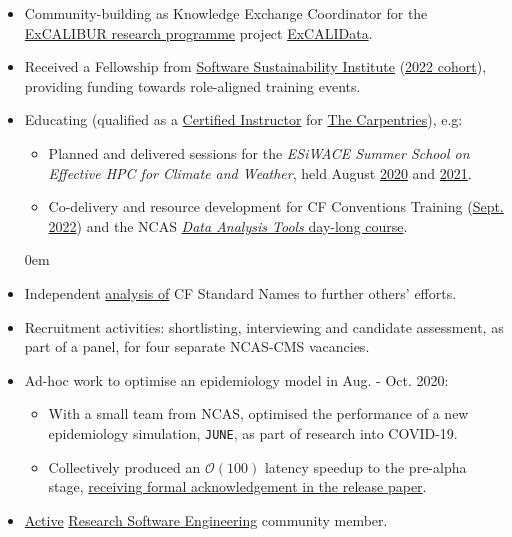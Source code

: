 \documentclass[10pt,a4paper]{cv_template}
\begin{document}
\begin{paracol}{2}
\begin{itemize}
\itemsep0em
  \item Community-building as Knowledge Exchange Coordinator for the \href{https://excalibur.ac.uk/}{ExCALIBUR research programme} project \href{https://excalibur.ac.uk/projects/excalidata/}{ExCALIData}.
  \item Received a Fellowship from \href{https://www.software.ac.uk/about}{Software Sustainability Institute} (\href{https://www.software.ac.uk/about/fellows}{2022 cohort}), providing funding towards role-aligned training events.
  \item Educating (qualified as a \href{https://carpentries.org/instructors/}{Certified Instructor} for \href{https://carpentries.org/about/}{The Carpentries}), e.g:
  \begin{itemize}
  \itemsep0em
    \item Planned and delivered sessions for the \textit{ESiWACE Summer School on Effective HPC for Climate and Weather}, held August \href{https://hps.vi4io.org/events/2020/esiwace-school}{2020} and \href{https://hps.vi4io.org/events/2021/esiwace-school}{2021}.
    \item Co-delivery and resource development for CF Conventions Training (\href{http://cfconventions.org/Training/2022-Training-Workshop.html}{Sept. 2022}) and the NCAS \href{https://ncas.ac.uk/study-with-us/data-analysis-tools/}{\textit{Data Analysis Tools} day-long course}.
  \end{itemize}
  \itemsep0em
  \item Independent \href{https://sadielbartholomew.github.io/cf-standard-names-linguistics/}{analysis of} CF Standard Names to further others' efforts.
  \item Recruitment activities: shortlisting, interviewing and candidate assessment, as part of a panel, for four separate NCAS-CMS vacancies.
  \item Ad-hoc work to optimise an epidemiology model in Aug. - Oct. 2020:
  \begin{itemize}
  \itemsep0em
    \item With a small team from NCAS, optimised the performance of a new epidemiology simulation, \texttt{JUNE}, as part of research into COVID-19.
    \item Collectively produced an $\mathcal{O}(100)$ latency speedup to the pre-alpha stage, \href{https://doi.org/10.1101/2020.12.15.20248246}{receiving formal acknowledgement in the release paper}.
  \end{itemize}
  \item \href{https://github.com/sadielbartholomew/sadielbartholomew/tree/master/talks#readme}{Active} \href{https://society-rse.org/community/}{Research Software Engineering} community member.
\end{itemize}


\end{paracol}
\end{document}
